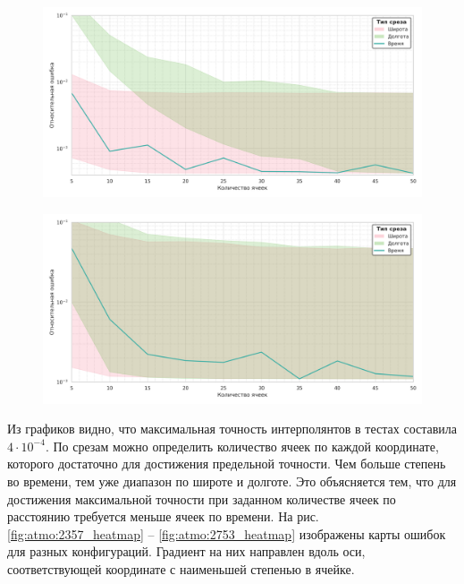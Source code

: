  \begin{figure}[h!]
    \centering
    \includegraphics[width=\linewidth]{../images/solution/atmo/2735.png}
    \label{fig:atmo:2735}
 \end{figure}

 \begin{figure}[h!]
    \centering
    \includegraphics[width=\linewidth]{../images/solution/atmo/2753.png}
    \label{fig:atmo:2753}
 \end{figure}

 Из графиков видно, что максимальная точность интерполянтов в тестах составила $4 \cdot 10^{-4}$.
 По срезам можно определить количество ячеек по каждой координате, которого достаточно для достижения
 предельной точности. Чем больше степень во времени, тем уже диапазон по широте и долготе. Это объясняется тем,
 что для достижения максимальной точности при заданном количестве ячеек по расстоянию
 требуется меньше ячеек по времени. На рис. \ref{fig:atmo:2357_heatmap} -- \ref{fig:atmo:2753_heatmap} изображены карты
 ошибок для разных конфигураций. Градиент на них направлен вдоль оси, соответствующей
 координате с наименьшей степенью в ячейке.

